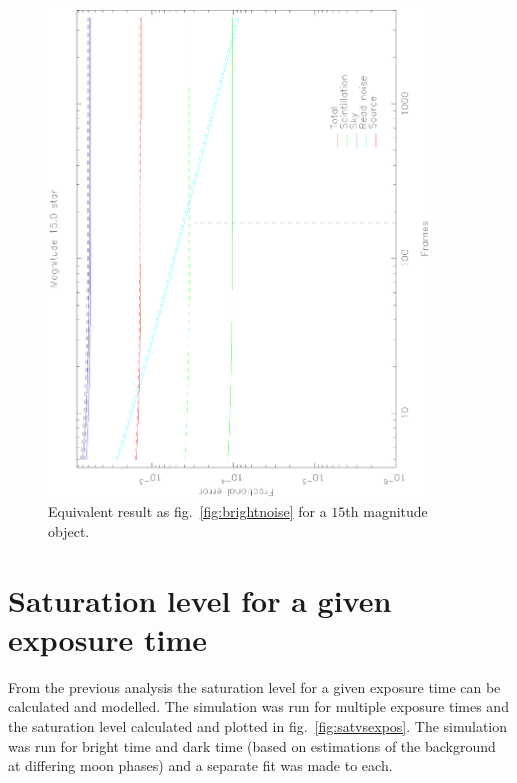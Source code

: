 \documentclass[a4paper]{report}
\begin{document}
\begin{figure}
    \begin{center}
        \includegraphics[angle=270,width=0.9\textwidth]{images/faint}
    \end{center}
    \caption{Equivalent result as fig.~\ref{fig:brightnoise} for a
$15$th magnitude object.}
    \label{fig:faintnoise}
\end{figure}



\section{Saturation level for a given exposure time}
\label{sec:satlevel}

From the previous analysis the saturation level for a given exposure
time can be calculated and modelled. The simulation was run for multiple
exposure times and the saturation level calculated and plotted in
fig.~\ref{fig:satvsexpos}. The simulation was run for bright time and
dark time (based on estimations of the background at differing moon
phases) and a separate fit was made to each.
\end{document}
